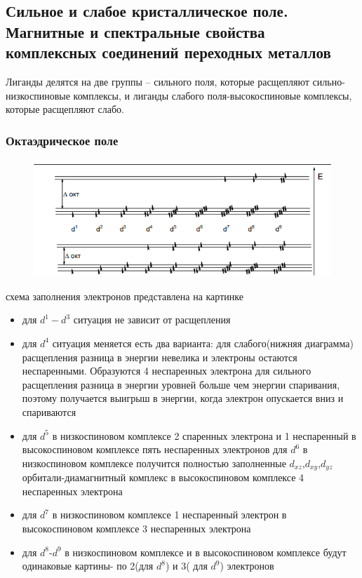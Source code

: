 \subsection{Сильное и слабое кристаллическое поле. Магнитные и спектральные свойства комплексных соединений переходных металлов}

 Лиганды делятся на две группы – сильного поля, которые расщепляют сильно-низкоспиновые комплексы, и лиганды слабого поля-высокоспиновые комплексы, которые расщепляют слабо. 
 \subsubsection{Октаэдрическое поле}
 
 \begin{figure}[htp]
\centering
\includegraphics[scale=1.00]{images/electrones.png}
\end{figure} схема заполнения электронов представлена на картинке

 \begin{itemize}
 \item для $d^1-d^3$ ситуация не зависит от расщепления \item для $d^4$ ситуация меняется есть два варианта: для слабого(нижняя диаграмма) расщепления разница в энергии невелика и электроны остаются неспаренными. Образуются 4 неспаренных электрона  для сильного расщепления разница в энергии уровней больше чем энергии спаривания, поэтому получается выигрыш в энергии, когда электрон опускается вниз и спариваются \item для $d^5$ в низкоспиновом комплексе 2 спаренных электрона и 1 неспаренный в высокоспиновом комплексе пять неспаренных электронов для $d^6$ в низкоспиновом комплексе получится полностью заполненные $d_{xz}$,$d_{xy}$,$d_{yz}$ орбитали-диамагнитный комплекс в высокоспиновом комплексе 4 неспаренных электрона 
 \item для $d^7$ в низкоспиновом комплексе 1 неспаренный электрон в высокоспиновом комплексе 3 неспаренных электрона 
 \item для $d^8$-$d^9$ в низкоспиновом комплексе и в высокоспиновом комплексе будут одинаковые картины- по 2(для $d^8$) и 3( для $d^9$) электронов 
 \end{itemize}

